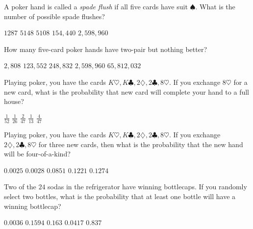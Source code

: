 \documentclass[answers,12pt]{exam}
\begin{document}
\begin{questions}
\question A poker hand is called a {\em spade flush}
if all five cards have suit $\spadesuit$. What is
the number of possible spade flushes?\\
\begin{oneparchoices}
\correctchoice $1287$
\choice $5148$ %
\choice $5108$ %
\choice $154,440$ %
\choice $2,598,960$ %
\end{oneparchoices}

\question 
How many five-card poker hands have two-pair but nothing better?\\
\begin{oneparchoices}
\choice $2,808$ %
\correctchoice $123,552$
\choice $248,832$ %
\choice $2,598,960$ %
\choice $65,812,032$ %
\end{oneparchoices}

\question Playing poker, you have the cards
$K\heartsuit,K\clubsuit,2\diamondsuit,2\clubsuit,8\heartsuit$.
If you exchange $8\heartsuit$ for a new card,
what is the probability that new card
will complete your hand to a full house?\\
\begin{oneparchoices}
\choice $\frac{1}{52}$
\choice $\frac{1}{26}$ %
\choice $\frac{2}{47}$ %
\choice $\frac{1}{13}$ %
\correctchoice $\frac{4}{47}$
\end{oneparchoices}

\question Playing poker, you have the cards
$K\heartsuit,K\clubsuit,2\diamondsuit,2\clubsuit,8\heartsuit$.
If you exchange $2\diamondsuit,2\clubsuit,8\heartsuit$ for three
new cards, then what is the probability that the new hand
will be four-of-a-kind?\\
\begin{oneparchoices}
\choice $0.0025$ %
\correctchoice $0.0028$
\choice $0.0851$ %
\choice $0.1221$ %
\choice $0.1274$ %
\end{oneparchoices}

\question Two of the $24$ sodas in the refrigerator
have winning bottlecaps. If you randomly select two
bottles, what is the probability that at least one bottle
will have a winning bottlecap?\\
\begin{oneparchoices}
\choice $0.0036$ %
\choice $0.1594$ %
\correctchoice $0.163$
\choice $0.0417$ %
\choice $0.837$ %
\end{oneparchoices}

\end{questions}
\end{document}
